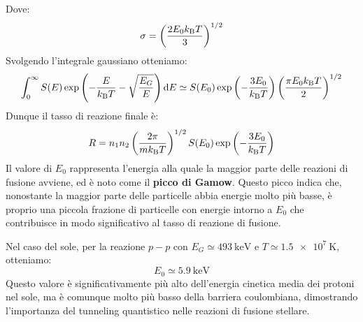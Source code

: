 Dove:
\begin{equation}
    \sigma = \left(\dfrac{2E_0 k_{\text{B}} T}{3}\right)^{1/2}
\end{equation}
Svolgendo l'integrale gaussiano otteniamo:
\begin{equation}
    \int_0^{\infty} S(E) \exp\left(-\dfrac{E}{k_{\text{B}} T} - \sqrt{\dfrac{E_G}{E}}\right) \dd{E} \simeq S(E_0) \exp\left(-\dfrac{3E_0}{k_{\text{B}} T}\right) \left(\dfrac{\pi E_0 k_{\text{B}} T}{2}\right)^{1/2}
\end{equation}
Dunque il tasso di reazione finale è:
\begin{equation}
    R = n_1 n_2 \left(\dfrac{2 \pi}{m k_{\text{B}} T}\right)^{1/2} S(E_0) \exp\left(-\dfrac{3E_0}{k_{\text{B}} T}\right)
\end{equation}
Il valore di $E_0$ rappresenta l'energia alla quale la maggior parte delle reazioni di fusione avviene, ed è noto come il \textbf{picco di Gamow}. Questo picco indica che, nonostante la maggior parte delle particelle abbia energie molto più basse, è proprio una piccola frazione di particelle con energie intorno a $E_0$ che contribuisce in modo significativo al tasso di reazione di fusione.


Nel caso del sole, per la reazione $p-p$ con $E_G \simeq \qty{493}{\kilo\electronvolt}$ e $T \simeq \qty{1.5e7}{\kelvin}$, otteniamo:
\begin{equation}
    E_0 \simeq \qty{5.9}{\kilo\electronvolt}
\end{equation}
Questo valore è significativamente più alto dell'energia cinetica media dei protoni nel sole, ma è comunque molto più basso della barriera coulombiana, dimostrando l'importanza del tunneling quantistico nelle reazioni di fusione stellare.
